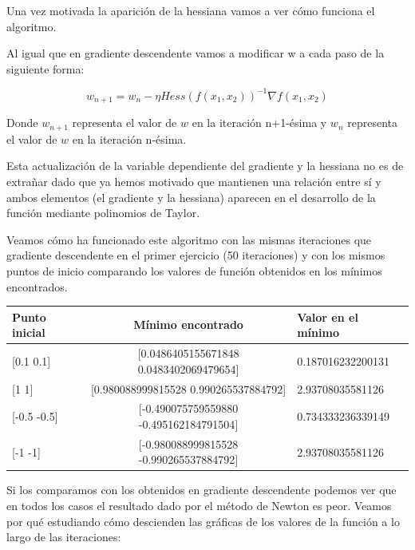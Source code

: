 \documentclass[12pt,a4paper]{article}
\begin{document}
Una vez motivada la aparición de la hessiana vamos a ver cómo funciona el algoritmo.

Al igual que en gradiente descendente vamos a modificar w a cada paso de la siguiente forma:

$$w_{n+1} = w_n-\eta Hess(f(x_1,x_2))^{-1}\nabla f(x_1,x_2)$$

Donde $w_{n+1}$ representa el valor de $w$ en la iteración n+1-ésima y $w_n$ representa el valor de $w$ en la iteración n-ésima.

Esta actualización de la variable dependiente del gradiente y la hessiana no es de extrañar dado que ya hemos motivado que mantienen una relación entre sí y ambos elementos (el gradiente y la hessiana) aparecen en el desarrollo de la función mediante polinomios de Taylor.

Veamos cómo ha funcionado este algoritmo con las mismas iteraciones que gradiente descendente en el primer ejercicio (50 iteraciones) y con los mismos puntos de inicio comparando los valores de función obtenidos en los mínimos encontrados.

\begin{table}[H]
	\begin{tabular}{|l|c|l|}
		\hline
		{\textbf{Punto inicial}} & {\textbf{Mínimo encontrado}}            & {\textbf{Valor en el mínimo}} \\ \hline \hline
		{[}0.1 0.1{]}                & {[}0.0486405155671848 0.0483402069479654{]}  & 0.187016232200131                          \\ \hline
		{[}1 1{]}                    & {[}0.980088999815528 0.990265537884792{]}    & 2.93708035581126                          \\ \hline
		{[}-0.5 -0.5{]}              & {[}-0.490075759559880 -0.495162184791504{]} & 0.734333236339149                          \\ \hline
		{[}-1 -1{]}                  & {[}-0.980088999815528 -0.990265537884792{]}  & 2.93708035581126                          \\ \hline
	\end{tabular}
\end{table}

Si los comparamos con los obtenidos en gradiente descendente podemos ver que en todos los casos el resultado dado por el método de Newton es peor. Veamos por qué estudiando cómo descienden las gráficas de los valores de la función a lo largo de las iteraciones:
\end{document}
